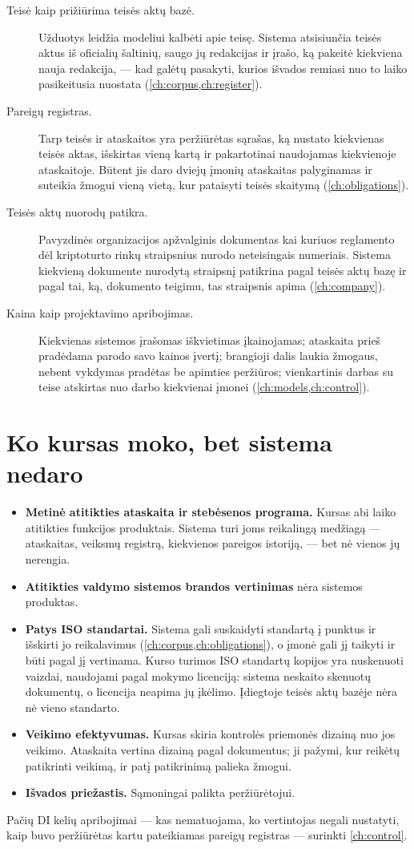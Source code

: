 \begin{description}
  \item[Teisė kaip prižiūrima teisės aktų bazė.] Užduotys leidžia modeliui kalbėti apie teisę.
    Sistema atsisiunčia teisės aktus iš oficialių šaltinių, saugo jų redakcijas ir įrašo, ką
    pakeitė kiekviena nauja redakcija, --- kad galėtų pasakyti, kurios išvados remiasi nuo to
    laiko pasikeitusia nuostata (\cref{ch:corpus,ch:register}).
  \item[Pareigų registras.] Tarp teisės ir ataskaitos yra peržiūrėtas sąrašas, ką nustato
    kiekvienas teisės aktas, išskirtas vieną kartą ir pakartotinai naudojamas kiekvienoje
    ataskaitoje. Būtent jis daro dviejų įmonių ataskaitas palyginamas ir suteikia žmogui vieną
    vietą, kur pataisyti teisės skaitymą (\cref{ch:obligations}).
  \item[Teisės aktų nuorodų patikra.] Pavyzdinės organizacijos apžvalginis dokumentas kai kuriuos
    reglamento dėl kriptoturto rinkų straipsnius nurodo neteisingais numeriais. Sistema
    kiekvieną dokumente nurodytą straipsnį patikrina pagal teisės aktų bazę ir pagal tai, ką,
    dokumento teigimu, tas straipsnis apima (\cref{ch:company}).
  \item[Kaina kaip projektavimo apribojimas.] Kiekvienas sistemos įrašomas iškvietimas
    įkainojamas; ataskaita prieš pradėdama parodo savo kainos įvertį; brangioji dalis laukia
    žmogaus, nebent vykdymas pradėtas be apimties peržiūros; vienkartinis darbas su teise
    atskirtas nuo darbo kiekvienai įmonei (\cref{ch:models,ch:control}).
\end{description}

\section{Ko kursas moko, bet sistema nedaro}\label{sec:course:not}

\begin{itemize}
  \item \textbf{Metinė atitikties ataskaita ir stebėsenos programa.} Kursas abi laiko atitikties
    funkcijos produktais. Sistema turi joms reikalingą medžiagą --- ataskaitas, veiksmų
    registrą, kiekvienos pareigos istoriją, --- bet nė vienos jų nerengia.
  \item \textbf{Atitikties valdymo sistemos brandos vertinimas} nėra sistemos produktas.
  \item \textbf{Patys ISO standartai.} Sistema gali suskaidyti standartą į punktus ir išskirti
    jo reikalavimus (\cref{ch:corpus,ch:obligations}), o įmonė gali jį taikyti ir būti pagal jį
    vertinama. Kurso turimos ISO standartų kopijos yra nuskenuoti vaizdai, naudojami pagal
    mokymo licenciją: sistema neskaito skenuotų dokumentų, o licencija neapima jų įkėlimo.
    Įdiegtoje teisės aktų bazėje nėra nė vieno standarto.
  \item \textbf{Veikimo efektyvumas.} Kursas skiria kontrolės priemonės dizainą nuo jos
    veikimo. Ataskaita vertina dizainą pagal dokumentus; ji pažymi, kur reikėtų patikrinti
    veikimą, ir patį patikrinimą palieka žmogui.
  \item \textbf{Išvados priežastis.} Sąmoningai palikta peržiūrėtojui.
\end{itemize}

Pačių DI kelių apribojimai --- kas nematuojama, ko vertintojas negali nustatyti, kaip buvo
peržiūrėtas kartu pateikiamas pareigų registras --- surinkti \cref{ch:control}.
